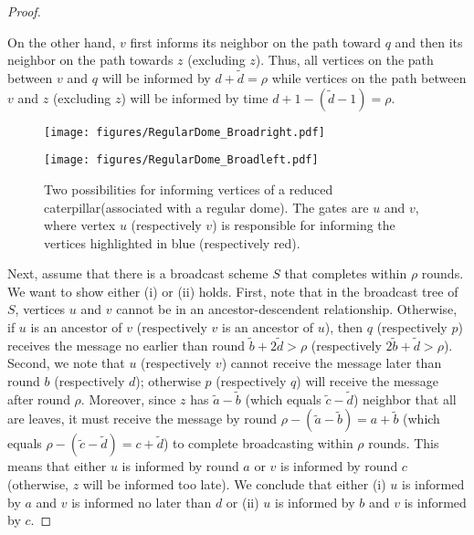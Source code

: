 \documentclass[letterpaper,11pt]{article}
\newcommand{\cater}{reduced caterpillar\xspace}
\begin{document}
\begin{proof}
\begin{itemize}
On the other hand, $v$ first informs its neighbor on the path toward $q$ and then its neighbor on the path towards $z$ (excluding $z$). Thus, all vertices on the path between $v$ and $q$ will be informed by $d+\tilde{d} = \rho$ while vertices on the path between $v$ and $z$ (excluding $z$) will be informed by time $d + 1 - (\tilde{d}-1) = \rho$. 
\end{itemize}

\begin{figure}
    \centering
    \begin{minipage}[b]{0.47\textwidth}
        \centering
        \texttt{[image: figures/RegularDome\_Broadright.pdf]}   \label{fig:regular_broadright}
    \end{minipage}
    \hfill
    \begin{minipage}[b]{0.47\textwidth} \centering
        \texttt{[image: figures/RegularDome\_Broadleft.pdf]}  \label{fig:regular_broadleft}
    \end{minipage}
    
    \caption{
    Two possibilities for informing vertices of a \cater (associated with a regular dome). The gates are $u$ and $v$, where vertex $u$ (respectively $v$) is responsible for informing the vertices highlighted in blue (respectively red).}
    \label{fig:regular_broadcastcases}
\end{figure}


Next, assume that there is a broadcast scheme $S$ that completes within $\rho$ rounds. We want to show either (i) or (ii) holds. First, note that in the broadcast tree of $S$, vertices $u$ and $v$ cannot be in an ancestor-descendent relationship. Otherwise, if $u$ is an ancestor of $v$ (respectively $v$ is an ancestor of $u$), then $q$ (respectively $p$) receives the message no earlier than round $\tilde{b} + 2\tilde{d} > \rho$
(respectively $2\tilde{b} + \tilde{d} > \rho$). Second, we note that $u$ (respectively $v$) cannot receive the message later than round $b$ (respectively $d$); otherwise $p$ (respectively $q$) will receive the message after round $\rho$. Moreover, since $z$ has $\tilde{a} - \tilde{b}$ (which equals $\tilde{c}-\tilde{d}$) neighbor that all are leaves, it must receive the message by round $\rho - (\tilde{a} - \tilde{b}) = a + \tilde{b}$ (which equals $\rho - (\tilde{c} - \tilde{d}) = c + \tilde{d}$) to complete broadcasting within $\rho$ rounds. This means that either $u$ is informed by round $a$ or $v$ is informed by round $c$ (otherwise, $z$ will be informed too late). We conclude that either (i) $u$ is informed by $a$ and $v$ is informed no later than $d$  or (ii) $u$ is informed by $b$ and $v$ is informed by $c$. 
\end{proof}
\end{document}
